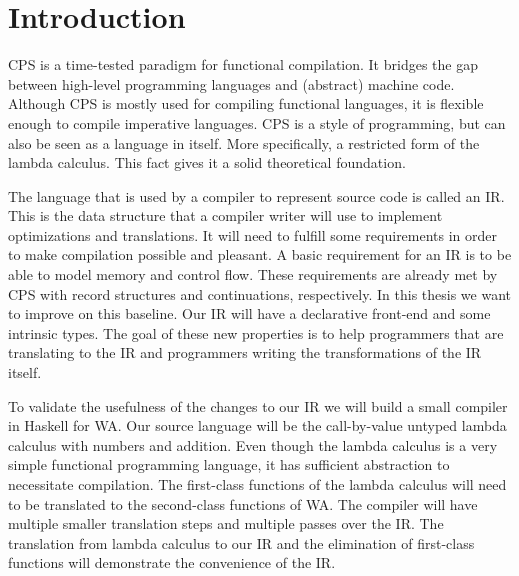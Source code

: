 
\chapter{\label{chap:introduction}Introduction}

CPS is a time-tested paradigm for functional compilation\autocite{steele1978rabbit, DBLP:books/daglib/0022396}. It bridges the gap between high-level programming languages and (abstract) machine code. Although \ac{CPS} is mostly used for compiling functional languages, it is flexible enough to compile imperative languages. \ac{CPS} is a style of programming, but can also be seen as a language in itself. More specifically, a restricted form of the lambda calculus\autocite{barendregt1984lambda}. This fact gives it a solid theoretical foundation.


The language that is used by a compiler to represent source code is called an \ac{IR}. This is the data structure that a compiler writer will use to implement optimizations and translations. It will need to fulfill some requirements in order to make compilation possible and pleasant. A basic requirement for an \ac{IR} is to be able to model memory and control flow\autocite{bruin2020framevm}. These requirements are already met by \ac{CPS} with record structures and continuations, respectively. In this thesis we want to improve on this baseline. Our \ac{IR} will have a declarative front-end and some intrinsic types. The goal of these new properties is to help programmers that are translating to the \ac{IR} and programmers writing the transformations of the \ac{IR} itself.

To validate the usefulness of the changes to our \ac{IR} we will build a small compiler in Haskell\autocite{haskellhomepage} for \ac{WA}\autocite{webassemblyhomepage}. Our source language will be the call-by-value untyped lambda calculus with numbers and addition. Even though the lambda calculus is a very simple functional programming language, it has sufficient abstraction to necessitate compilation. The first-class functions of the lambda calculus will need to be translated to the second-class functions of \ac{WA}. The compiler will have multiple smaller translation steps and multiple passes over the \ac{IR}. The translation from lambda calculus to our \ac{IR} and the elimination of first-class functions will demonstrate the convenience of the \ac{IR}.

